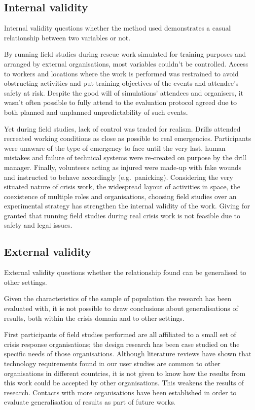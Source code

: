 \subsection{Internal validity}\label{internal-validity}

Internal validity questions whether the method used demonstrates a
casual relationship between two variables or not.

By running field studies during rescue work simulated for training
purposes and arranged by external organisations, most variables couldn't
be controlled. Access to workers and locations where the work is
performed was restrained to avoid obstructing activities and put
training objectives of the events and attendee's safety at risk. Despite
the good will of simulations' attendees and organisers, it wasn't often
possible to fully attend to the evaluation protocol agreed due to both
planned and unplanned unpredictability of such events.

Yet during field studies, lack of control was traded for realism. Drills
attended recreated working conditions as close as possible to real
emergencies. Participants were unaware of the type of emergency to face
until the very last, human mistakes and failure of technical systems
were re-created on purpose by the drill manager. Finally, volunteers
acting as injured were made-up with fake wounds and instructed to behave
accordingly (e.g.~panicking). Considering the very situated nature of
crisis work, the widespread layout of activities in space, the
coexistence of multiple roles and organisations, choosing field studies
over an experimental strategy has strengthen the internal validity of
the work. Giving for granted that running field studies during real
crisis work is not feasible due to safety and legal issues.

\subsection{External validity}\label{external-validity}

External validity questions whether the relationship found can be
generalised to other settings.

Given the characteristics of the sample of population the research has
been evaluated with, it is not possible to draw conclusions about
generalisations of results, both within the crisis domain and to other
settings.

First participants of field studies performed are all affiliated to a
small set of crisis response organisations; the design research has been
case studied on the specific needs of those organisations. Although
literature reviews have shown that technology requirements found in our
user studies are common to other organisations in different countries,
it is not given to know how the results from this work could be accepted
by other organisations. This weakens the results of research. Contacts
with more organisations have been established in order to evaluate
generalisation of results as part of future works.

